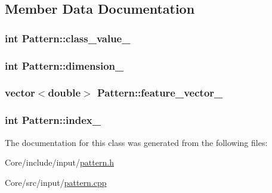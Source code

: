 \subsection{Member Data Documentation}
\hypertarget{classPattern_a739dc0a44f9aca7a860ccba0c303bdd3}{
\subsubsection[{class\+\_\+value\+\_\+}]{\setlength{\rightskip}{0pt plus 5cm}int Pattern\+::class\+\_\+value\+\_\+\hspace{0.3cm}{\ttfamily [private]}}}\label{classPattern_a739dc0a44f9aca7a860ccba0c303bdd3}
\hypertarget{classPattern_aca4d3f613b783e6190691ae71531374d}{
\subsubsection[{dimension\+\_\+}]{\setlength{\rightskip}{0pt plus 5cm}int Pattern\+::dimension\+\_\+\hspace{0.3cm}{\ttfamily [private]}}}\label{classPattern_aca4d3f613b783e6190691ae71531374d}
\hypertarget{classPattern_a8920639f6ec13502728eaf390056ee13}{
\subsubsection[{feature\+\_\+vector\+\_\+}]{\setlength{\rightskip}{0pt plus 5cm}vector$<$double$>$ Pattern\+::feature\+\_\+vector\+\_\+\hspace{0.3cm}{\ttfamily [private]}}}\label{classPattern_a8920639f6ec13502728eaf390056ee13}
\hypertarget{classPattern_a029289d4eac5c7d338f34c428ffc6a55}{
\subsubsection[{index\+\_\+}]{\setlength{\rightskip}{0pt plus 5cm}int Pattern\+::index\+\_\+\hspace{0.3cm}{\ttfamily [private]}}}\label{classPattern_a029289d4eac5c7d338f34c428ffc6a55}


The documentation for this class was generated from the following files\+:\begin{DoxyCompactItemize}
\item 
Core/include/input/\hyperlink{pattern_8h}{pattern.\+h}\item 
Core/src/input/\hyperlink{pattern_8cpp}{pattern.\+cpp}\end{DoxyCompactItemize}
